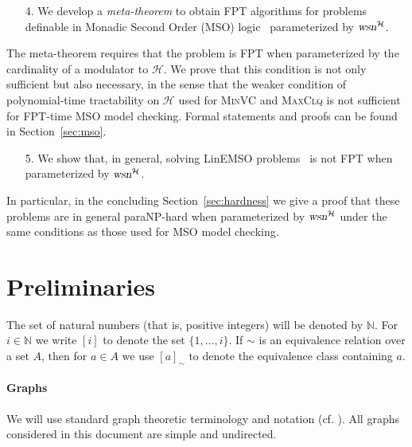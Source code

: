 \documentclass{llncs}
\newcommand{\Nat}{\mathbb{N}}
\def\HH{{\mathcal H}}
\newcommand{\wsn}{\text{\normalfont\slshape wsn}}
\begin{document}
\begin{enumerate}[leftmargin=*,nosep]
\item[4.] We develop a \emph{meta-theorem} to obtain FPT algorithms for problems definable in Monadic Second Order (MSO) logic~\cite{CourcelleMakowskyRotics00} parameterized by $\wsn^\HH$.
\end{enumerate}
\smallskip
The meta-theorem requires that the problem is FPT when parameterized by the cardinality of a modulator to $\HH$. We prove that this condition is not only sufficient but also necessary, in the sense that the weaker condition of polynomial-time tractability on $\HH$ used for \textsc{MinVC} and \textsc{MaxClq} is not sufficient for FPT-time MSO model checking. Formal statements and proofs can be found in Section~\ref{sec:mso}.
\smallskip

\begin{enumerate}[leftmargin=*,nosep]
\item[5.] We show that, in general, solving LinEMSO problems~\cite{CourcelleMakowskyRotics00,GanianHlineny10} is not FPT when parameterized by $\wsn^\HH$.
\end{enumerate}
\smallskip
In particular, in the concluding Section~\ref{sec:hardness} we give a proof that these problems are in general paraNP-hard when parameterized by $\wsn^\HH$ under the same conditions as those used for MSO model checking. 








\section{Preliminaries}\label{sec:prel}
The set of natural numbers (that is, positive integers) will be denoted by
$\Nat$. For $i \in \Nat$ we write $[i]$ to denote the set $\{1,
\dots, i \}$. If $\sim$ is an equivalence relation over a set $A$, then for $a\in A$ we use $[a]_{\sim}$ to denote the equivalence class containing $a$.

\paragraph{Graphs} We will use standard graph theoretic terminology and notation
(cf. \cite{Diestel00}). All graphs considered in this document are simple and undirected. 
\end{document}
